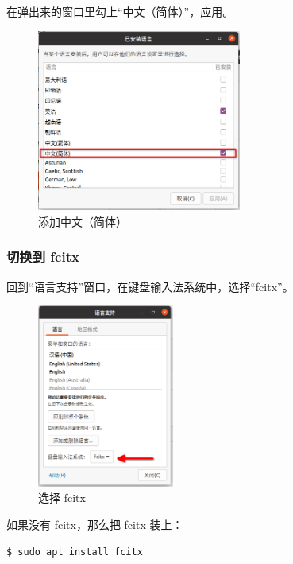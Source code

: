 \documentclass[UTF-8]{ctexart}
\begin{document}
				在弹出来的窗口里勾上“中文（简体）”，应用。
				
				\begin{figure}[H]
					\centering
					\includegraphics[width=0.6\textwidth]{fig/add_zh_cn.png}
					\caption*{添加中文（简体）}
				\end{figure}
			
			\subsubsection{切换到 fcitx}
	
				回到“语言支持”窗口，在键盘输入法系统中，选择“fcitx”。
				
				\begin{figure}[H]
					\centering
					\includegraphics[width=0.4\textwidth]{fig/choose_fcitx.png}
					\caption*{选择 fcitx}
				\end{figure}
				
				如果没有 fcitx，那么把 fcitx 装上：
				
				\begin{verbatim}
$ sudo apt install fcitx
				\end{verbatim}
			
\end{document}
